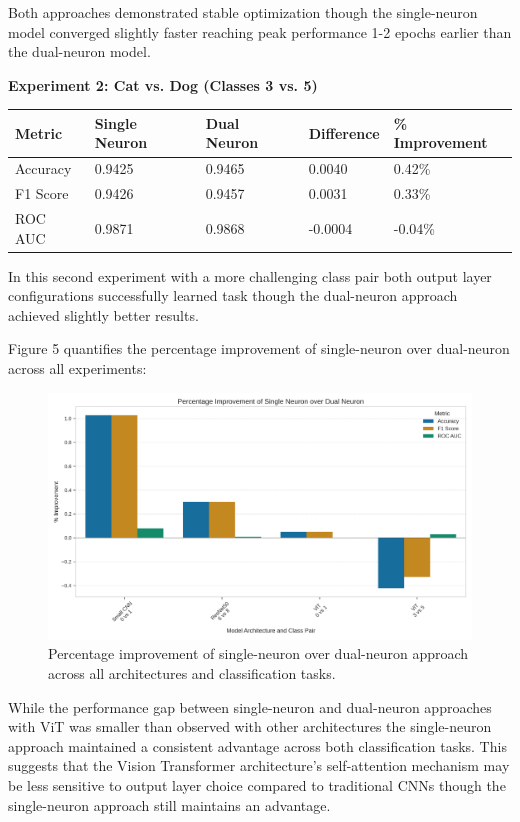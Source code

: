 \documentclass[11pt]{article}
\begin{document}
Both approaches demonstrated stable optimization though the single-neuron model converged slightly faster reaching peak performance 1-2 epochs earlier than the dual-neuron model.

\textbf{Experiment 2: Cat vs. Dog (Classes 3 vs. 5)}

\begin{tabular}{lllll}
\hline
Metric & Single Neuron & Dual Neuron & Difference & \% Improvement \\
\hline
Accuracy & 0.9425 & 0.9465 & 0.0040 & 0.42\% \\
F1 Score & 0.9426 & 0.9457 & 0.0031 & 0.33\% \\
ROC AUC & 0.9871 & 0.9868 & -0.0004 & -0.04\% \\
\hline
\end{tabular}

In this second experiment with a more challenging class pair both output layer configurations successfully learned task though the dual-neuron approach achieved slightly better results.

Figure 5 quantifies the percentage improvement of single-neuron over dual-neuron across all experiments:

\begin{figure}[htbp]
\centering
\includegraphics[width=\textwidth]{figures/improvement_percentage.png}
\caption{Percentage improvement of single-neuron over dual-neuron approach across all architectures and classification tasks.}
\end{figure}

While the performance gap between single-neuron and dual-neuron approaches with ViT was smaller than observed with other architectures the single-neuron approach maintained a consistent advantage across both classification tasks. This suggests that the Vision Transformer architecture's self-attention mechanism may be less sensitive to output layer choice compared to traditional CNNs though the single-neuron approach still maintains an advantage.
\end{document}
